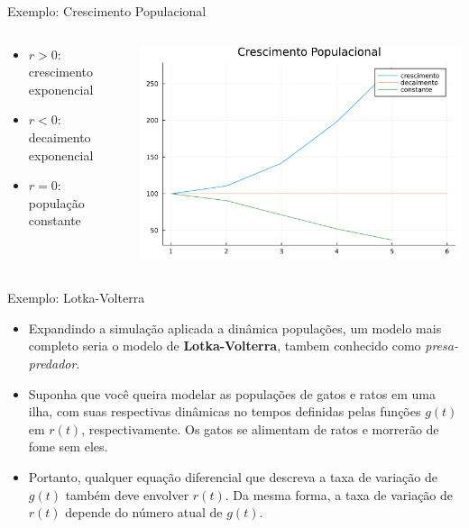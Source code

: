 \documentclass{beamer}
\begin{document}
		\begin{frame}{Exemplo: Crescimento Populacional}
			\begin{columns}
				\begin{column}{0.5\textwidth}
					\begin{itemize}
						\item $r > 0$: crescimento exponencial
						\item $r < 0$: decaimento exponencial
						\item $r = 0$: população constante
					\end{itemize}
				\end{column}
				\begin{column}{.5\textwidth}
					\includegraphics[width=\textwidth]{cres_pop}
				\end{column}
			\end{columns}
		\end{frame}
		\begin{frame}{Exemplo: Lotka-Volterra}
			\begin{itemize}[<+->]
				\item Expandindo a simulação aplicada a dinâmica populações, um modelo mais completo seria o modelo de \textbf{Lotka-Volterra}, tambem conhecido como \emph{presa-predador}.
				\item Suponha que você queira modelar as populações de gatos e ratos em uma ilha, com suas respectivas dinâmicas no tempos definidas pelas funções $g(t)$ em $r(t)$, respectivamente. Os gatos se alimentam de ratos e morrerão de fome sem eles.
				\item Portanto, qualquer equação diferencial que descreva a taxa de variação de $g(t)$ também deve envolver $r(t)$. Da mesma forma, a taxa de variação de $r(t)$ depende do número atual de $g(t)$.
			\end{itemize}
		\end{frame}
\end{document}
